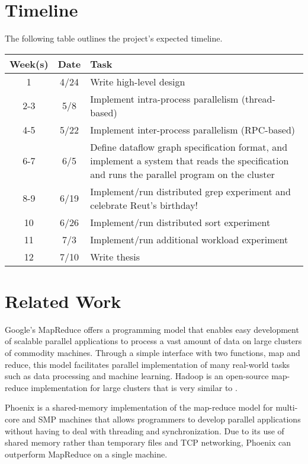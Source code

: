 \documentclass{acm_proc_article-sp}
\begin{document}
\section{Timeline}
The following table outlines the project's expected timeline.
\newenvironment{noop}{}{}
\begin{noop}\begin{tabular}{|c|c|p{2.2in}|} \hline
Week(s)&Date&Task\\ \hline
1 & 4/24 & Write high-level design\\ \hline
2-3 & 5/8 & Implement intra-process parallelism (thread-based)\\ \hline
4-5 & 5/22 & Implement inter-process parallelism (RPC-based)\\ \hline
6-7 & 6/5 & Define dataflow graph specification format, and implement a system that reads the specification and runs the parallel program on the cluster\\ \hline
8-9 & 6/19 & Implement/run distributed grep experiment and celebrate Reut's birthday!\\ \hline
10 & 6/26 & Implement/run distributed sort experiment\\ \hline
11 & 7/3 & Implement/run additional workload experiment\\ \hline
12 & 7/10 & Write thesis\\
\hline\end{tabular}\end{noop}


\section{Related Work}
Google's MapReduce \cite{mapreduce} offers a programming model that enables easy development of scalable parallel applications to process a vast amount of data on large clusters of commodity machines. Through a simple interface with two functions, map and reduce, this model facilitates parallel implementation of many real-world tasks such as data processing and machine learning. Hadoop \cite{hadoop} is an open-source map-reduce implementation for large clusters that is very similar to \cite{mapreduce}.

Phoenix \cite{phoenix} is a shared-memory implementation of the map-reduce model for multi-core and SMP machines that allows programmers to develop parallel applications without having to deal with threading and synchronization. Due to its use of shared memory rather than temporary files and TCP networking, Phoenix can  outperform MapReduce on a single machine.
\end{document}
